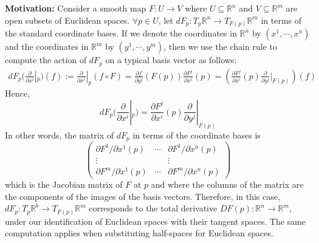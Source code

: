 \noindent\textbf{Motivation:} Consider a smooth map $F:U \to V$ where $U \subseteq \mathbb{R} ^n$ and $V\subseteq \mathbb{R}^m$ are open subsets of Euclidean spaces. $\forall p\in U$, let $dF_p:T_p \mathbb{R}^n \to T_{F(p)} \mathbb{R}^m$ in terms of the standard coordinate bases. If we denote the coordinates in $\mathbb{R}^n$ by $(x^1 ,\cdots, x^n)$ and the coordinates in $\mathbb{R}^m$ by $(y^1 ,\cdots, y^m)$, then we use the chain rule to compute the action of $dF_p$ on a typical basis vector as follows:
\begin{align*}
    dF_p (\frac{\partial}{\partial x^i}|_p) (f):= \frac{\partial}{\partial x^i}|_p (f\circ F) = \frac{\partial f}{\partial y^j} (F(p)) \frac{\partial F^j}{\partial x^i} (p)= (\frac{\partial F^j}{\partial x^i} (p) \frac{\partial}{\partial y^j}|_{F(p)}) (f)
\end{align*}
Hence, 
\[
dF_p(\frac{\partial}{\partial x^i}|_p) = \frac{\partial F^j}{\partial x^i} (p) \frac{\partial}{\partial y^j}|_{F(p)}
\]
In other words, the matrix of $dF_p$ in terms of the coordinate bases is
\[
\begin{pmatrix}
    \partial F^1/ \partial x^1(p) &\cdots &\partial F^1/ \partial x^n(p)\\
    \vdots &&\vdots\\
    \partial F^m/ \partial x^1(p) &\cdots &\partial F^m/ \partial x^n(p)
\end{pmatrix}
\]
which is the Jacobian matrix of $F$ at $p$ and where the columns of the matrix are the components of the images of the basis vectors. Therefore, in this case, $dF_p:T_p \mathbb{R}^b \to T_{F(p)} \mathbb{R}^m$ corresponds to the total derivative $DF(p): \mathbb{R}^n \to \mathbb{R}^m$, under our identification of Euclidean spaces with their tangent spaces. The same computation applies when substituting half-spaces for Euclidean spaces.

